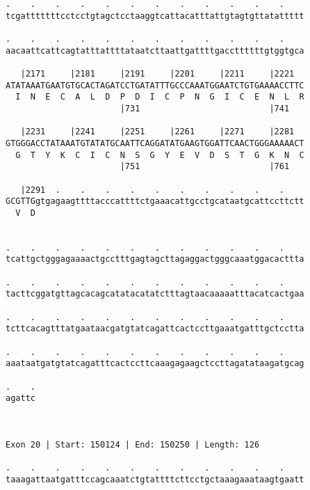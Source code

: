 \documentclass{article}
\begin{document}
\begin{Verbatim}
.    .    .    .    .    .    .    .    .    .    .    .    
tcgatttttttcctcctgtagctcctaaggtcattacatttattgtagtgttatattttt
                                                            
.    .    .    .    .    .    .    .    .    .    .    .    
aacaattcattcagtatttattttataatcttaattgattttgaccttttttgtggtgca
                                                            
   |2171     |2181     |2191     |2201     |2211     |2221  
ATATAAATGAATGTGCACTAGATCCTGATATTTGCCCAAATGGAATCTGTGAAAACCTTC
  I  N  E  C  A  L  D  P  D  I  C  P  N  G  I  C  E  N  L  R
                       |731                          |741   
  
   |2231     |2241     |2251     |2261     |2271     |2281  
GTGGGACCTATAAATGTATATGCAATTCAGGATATGAAGTGGATTCAACTGGGAAAAACT
  G  T  Y  K  C  I  C  N  S  G  Y  E  V  D  S  T  G  K  N  C
                       |751                          |761   
  
   |2291  .    .    .    .    .    .    .    .    .    .    
GCGTTGgtgagaagttttacccattttctgaaacattgcctgcataatgcattccttctt
  V  D                                                      
                                                            
  
.    .    .    .    .    .    .    .    .    .    .    .    
tcattgctgggagaaaactgcctttgagtagcttagaggactgggcaaatggacacttta
                                                            
.    .    .    .    .    .    .    .    .    .    .    .    
tacttcggatgttagcacagcatatacatatctttagtaacaaaaatttacatcactgaa
                                                            
.    .    .    .    .    .    .    .    .    .    .    .    
tcttcacagtttatgaataacgatgtatcagattcactccttgaaatgatttgctcctta
                                                            
.    .    .    .    .    .    .    .    .    .    .    .    
aaataatgatgtatcagatttcactccttcaaagagaagctccttagatataagatgcag
                                                            
.    .
agattc
      
      
 
Exon 20 | Start: 150124 | End: 150250 | Length: 126
 
.    .    .    .    .    .    .    .    .    .    .    .    
taaagattaatgatttccagcaaatctgtattttcttcctgctaaagaaataagtgaatt
                                                            

\end{Verbatim}
\end{document}
